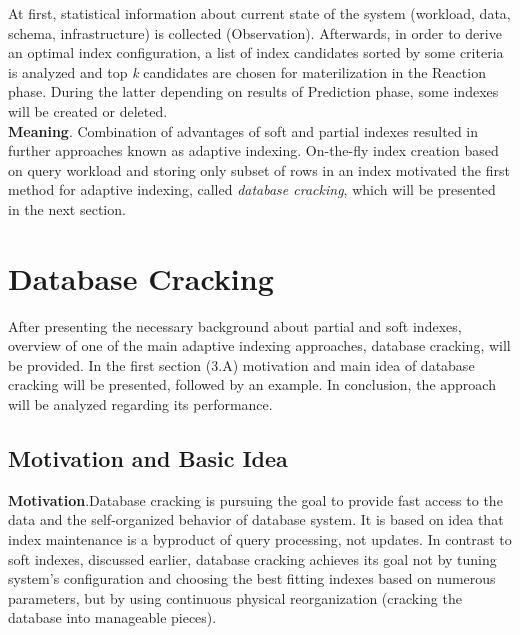 \documentclass[10pt, conference, compsocconf]{IEEEtran}
\begin{document}
At first, statistical information about current state of the system (workload, data, schema, infrastructure) is collected (Observation). Afterwards, in order to derive an optimal index configuration, a list of index candidates sorted by some criteria is analyzed and top \textit{k} candidates are chosen for materilization in the Reaction phase. During the latter depending on results of Prediction phase, some indexes will be created or deleted.\\

\textbf{Meaning}. Combination of advantages of soft and partial indexes resulted in further approaches known as adaptive indexing. On-the-fly index creation based on query workload and storing only subset of rows in an index motivated the first method for adaptive indexing, called \textit{database cracking}, which will be presented in the next section.

\section{Database Cracking}
After presenting the necessary background about partial and soft indexes, overview of one of the main adaptive indexing approaches, database cracking, will be provided. In the first section (3.A) motivation and main idea of database cracking will be presented, followed by %
an example. In conclusion, the approach will be analyzed regarding its performance.

\subsection{Motivation and Basic Idea}
\textbf{Motivation}.Database cracking is pursuing the goal to provide fast access to the data and the self-organized behavior of database system. It is based on idea that index maintenance is a byproduct of query processing, not updates. In contrast to soft indexes, discussed earlier, database cracking achieves its goal not by tuning system's configuration and choosing the best fitting indexes based on numerous parameters, but by using continuous physical reorganization (cracking the database into manageable pieces).
\end{document}
